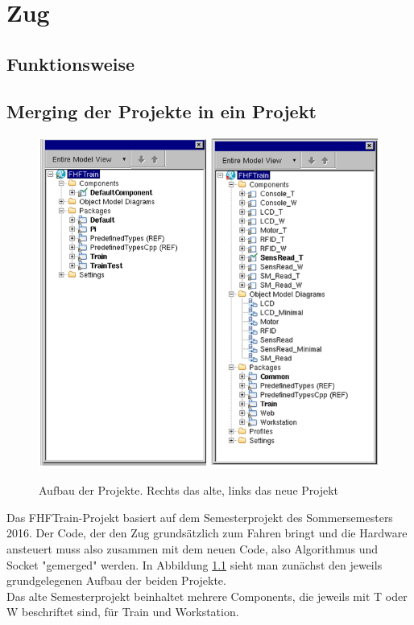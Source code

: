 \chapter{Zug}
\section{Funktionsweise}

\section{Merging der Projekte in ein Projekt}
\begin{figure}
	\caption{Aufbau der Projekte. Rechts das alte, links das neue Projekt}
	\includegraphics[width=1\textwidth]{content/pictures/train/structure.png}
	\label{pic:train_structure}
\end{figure}
Das FHFTrain-Projekt basiert auf dem Semesterprojekt des Sommersemesters 2016. Der Code, der den Zug grundsätzlich zum Fahren bringt und die Hardware ansteuert muss also zusammen mit dem neuen Code, also Algorithmus und Socket "gemerged" werden. In Abbildung \ref{pic:train_structure} sieht man zunächst den jeweils grundgelegenen Aufbau der beiden Projekte.\\  
Das alte Semesterprojekt beinhaltet mehrere Components, die jeweils mit T oder W beschriftet sind, für Train und Workstation.\\
